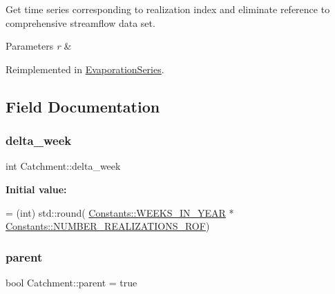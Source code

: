 Get time series corresponding to realization index and eliminate reference to comprehensive streamflow data set. 
\begin{DoxyParams}{Parameters}
{\em r} & \\
\hline
\end{DoxyParams}


Reimplemented in \mbox{\hyperlink{classEvaporationSeries_a4985ac4c81ec111657861e5750b24c0e_a4985ac4c81ec111657861e5750b24c0e}{Evaporation\+Series}}.



\subsection{Field Documentation}
\mbox{\label{classCatchment_a20548a9d03f0d39f297cb15b3c0433ad_a20548a9d03f0d39f297cb15b3c0433ad}} 
\subsubsection{\texorpdfstring{delta\+\_\+week}{delta\_week}}
{\footnotesize\ttfamily int Catchment\+::delta\+\_\+week\hspace{0.3cm}{\ttfamily [protected]}}

{\bfseries Initial value\+:}
\begin{DoxyCode}
= (int) std::round(
            \mbox{\hyperlink{namespaceConstants_a19e84af3cbc6e1318beb22408c2a1f2f_a19e84af3cbc6e1318beb22408c2a1f2f}{Constants::WEEKS\_IN\_YEAR}} * 
      \mbox{\hyperlink{namespaceConstants_ad6b1922ee031afa4b93176968d060fdf_ad6b1922ee031afa4b93176968d060fdf}{Constants::NUMBER\_REALIZATIONS\_ROF}})
\end{DoxyCode}
\mbox{\label{classCatchment_a472ff6892f90d94b8c4dba53c462dedf_a472ff6892f90d94b8c4dba53c462dedf}} 
\subsubsection{\texorpdfstring{parent}{parent}}
{\footnotesize\ttfamily bool Catchment\+::parent = true\hspace{0.3cm}{\ttfamily [protected]}}

